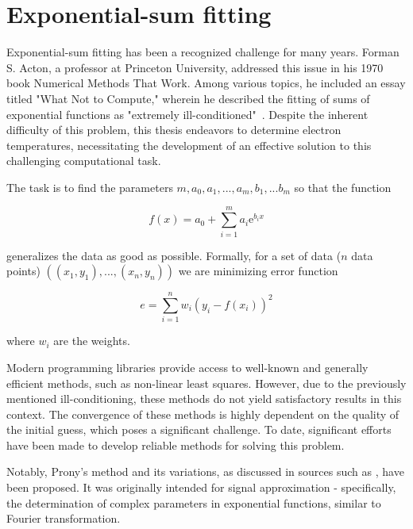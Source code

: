 \section{Exponential-sum fitting}
\label{sec:exp-fit}
Exponential-sum fitting has been a recognized challenge for many years. Forman S. Acton, a professor at Princeton University, addressed this issue in his 1970 book Numerical Methods That Work. Among various topics, he included an essay titled "What Not to Compute," wherein he described the fitting of sums of exponential functions as "extremely ill-conditioned"~\cite{acton1990}. Despite the inherent difficulty of this problem, this thesis endeavors to determine electron temperatures, necessitating the development of an effective solution to this challenging computational task. 

The task is to find the parameters $m, a_0, a_1,..., a_m, b_1,...b_m$ so that the function

\begin{equation}
	f(x) = a_0 + \sum_{i=1}^{m} a_i \mathrm{e}^{b_i x}
\end{equation}

generalizes the data as good as possible. Formally, for a set of data ($n$ data points) $\left(\left(x_1,y_1\right),..., \left(x_n,y_n\right)\right)$ we are minimizing error function

\begin{equation}
	e = \sum_{i=1}^{n}w_i(y_i-f(x_i))^2
\end{equation}

where $w_i$ are the weights.

Modern programming libraries provide access to well-known and generally efficient methods, such as non-linear least squares. However, due to the previously mentioned ill-conditioning, these methods do not yield satisfactory results in this context. The convergence of these methods is highly dependent on the quality of the initial guess, which poses a significant challenge. To date, significant efforts have been made to develop reliable methods for solving this problem. 

Notably, Prony's method \cite{prony1795} and its variations, as discussed in sources such as \cite{potts2010}, have been proposed. It was originally intended for signal approximation - specifically, the determination of complex parameters in exponential functions, similar to Fourier transformation.

